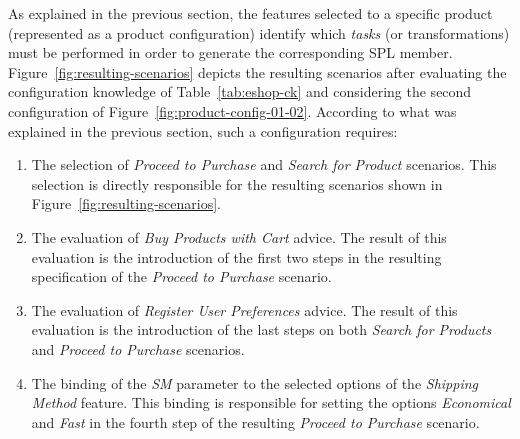 {\color{red} As explained in the previous section, the features selected to a specific product
(represented as a product configuration) identify which \emph{tasks} (or
transformations) must be performed in order to generate the corresponding SPL
member. 
Figure~\ref{fig:resulting-scenarios} depicts the resulting scenarios after evaluating the configuration knowledge of
Table~\ref{tab:eshop-ck} and considering the second configuration of
Figure~\ref{fig:product-config-01-02}. According to what was explained in the
previous section, such a configuration requires: 

\begin{enumerate} 
 \item The selection of \emph{Proceed to Purchase} and \emph{Search for Product} scenarios. This selection is directly responsible 
for the resulting scenarios shown in Figure~\ref{fig:resulting-scenarios}. 
  
 \item The evaluation of \emph{Buy Products with Cart} advice. The result of this evaluation is the introduction of the 
first two steps in the resulting specification of the \emph{Proceed to Purchase} scenario. 
 
 \item The evaluation of \emph{Register User Preferences} advice. The result of this evaluation is the introduction of the last steps 
{\color{blue}on} both \emph{Search for Products} and \emph{Proceed to
Purchase} scenarios.

 \item The binding of the \emph{SM} parameter to the selected options of the \emph{Shipping Method} feature. This binding is responsible for 
 setting the options \emph{Economical} and \emph{Fast} in the fourth step of the
 resulting \emph{Proceed to Purchase} scenario.

\end{enumerate}
}
 
